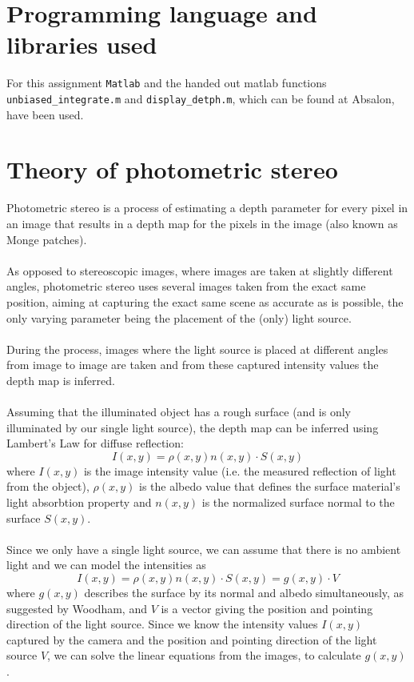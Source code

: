 \documentclass[12pt,a4paper,oneside,final]{article}
\begin{document}
\section{Programming language and libraries used}
For this assignment \texttt{Matlab} and the handed out matlab functions \texttt{unbiased\_integrate.m} and \texttt{display\_detph.m}, which can be found at Absalon, have been used.

\section{Theory of photometric stereo}
Photometric stereo is a process of estimating a depth parameter for every pixel in an image that results in a depth map for the pixels in the image (also known as Monge patches).\\\\
As opposed to stereoscopic images, where images are taken at slightly different angles, photometric stereo uses several images taken from the exact same position, aiming at capturing the exact same scene as accurate as is possible, the only varying parameter being the placement of the (only) light source.\\\\
During the process, images where the light source is placed at different angles from image to image are taken and from these captured intensity values the depth map is inferred.\\\\
Assuming that the illuminated object has a rough surface (and is only illuminated by our single light source), the depth map can be inferred using Lambert's Law for diffuse reflection:
\begin{equation}
I(x,y) = \rho(x,y) n(x,y) \cdot S(x,y)
\end{equation}
where $I(x,y)$ is the image intensity value (i.e. the measured reflection of light from the object), $\rho(x,y)$ is the albedo value that defines the surface material's light absorbtion property and $n(x,y)$ is the normalized surface normal to the surface $S(x,y)$.\\\\
Since we only have a single light source, we can assume that there is no ambient light and we can model the intensities as
\begin{equation}
I(x,y) = \rho(x,y) n(x,y) \cdot S(x,y) = g(x,y) \cdot V
\end{equation}
where $g(x,y)$ describes the surface by its normal and albedo simultaneously, as suggested by Woodham, and $V$ is a vector giving the position and pointing direction of the light source. Since we know the intensity values $I(x,y)$ captured by the camera and the position and pointing direction of the light source $V$, we can solve the linear equations from the images, to calculate $g(x,y)$.\\\\
\end{document}
